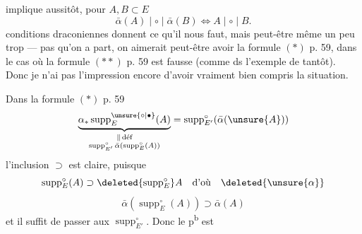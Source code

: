  implique aussitôt, pour $A,B\subset E$
\[
\bar\alpha(A)\mid\circ\mid\bar\alpha(B)\Longleftrightarrow A\mid\circ\mid B.
\]
 conditions draconiennes donnent ce qu'il nous faut, mais peut-être même un peu  trop ---  pas qu'on a
 part, on aimerait peut-être  avoir la formule $(*)$ p. 59, dans le cas où la formule $(**)$ p. 59 est fausse (comme ds l'exemple de tantôt). Donc je n'ai pas l'impression encore d'avoir vraiment bien compris la situation.

Dans la formule $(*)$ p. 59
\[
\underbrace{\alpha_*\operatorname{supp}^{\unsure{\circ|\bullet}}_E(A)}_{\substack{\Vert\,\text{déf}\\\operatorname{supp}^{\circ}_{E'}\bar\alpha(\operatorname{supp}^{\circ}_E(A))}}
=\operatorname{supp}^{\circ}_{E'}(\bar\alpha(\unsure{A}))
\]
l'inclusion $\supset$ est claire, puisque
\[
\operatorname{supp}^{\circ}_E(A)\supset\deleted{\operatorname{supp}^{\circ}_E}A\quad\text{d'où}\quad\deleted{\unsure{\alpha}}
\]
\[
\bar\alpha(\operatorname{supp}^{\circ}_E(A))\supset\bar\alpha(A)
\]
et il suffit de passer aux $\operatorname{supp}^{\circ}_{E'}$. Donc le p\textsuperscript{b} est
